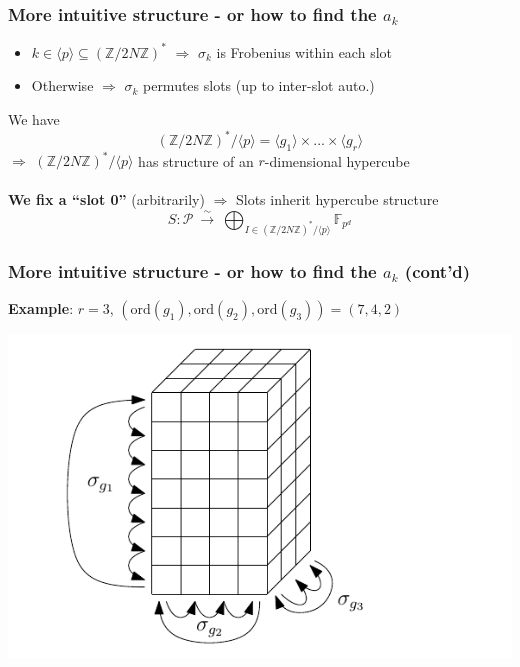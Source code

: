 \documentclass{beamer}
\newcommand{\Z}{\mathbb{Z}}
\newcommand{\F}{\mathbb{F}}
\begin{document}
\begin{frame}
    \frametitle{More intuitive structure - or how to find the $a_k$}
    \begin{itemize}
        \item $k \in \langle p \rangle \subseteq (\Z/2N\Z)^*$ $\Rightarrow$ $\sigma_k$ is Frobenius within each slot
        \item Otherwise $\Rightarrow$ $\sigma_k$ permutes slots (up to inter-slot auto.)
    \end{itemize}
    We have
    \begin{equation*}
        (\Z/2N\Z)^*/\langle p \rangle = \langle g_1 \rangle \times ... \times \langle g_r \rangle
    \end{equation*}
    $\Rightarrow$ $(\Z/2N\Z)^*/\langle p \rangle$ has structure of an $r$-dimensional hypercube
    \\~\\
    \textbf{We fix a ``slot 0''} (arbitrarily) $\Rightarrow$ Slots inherit hypercube structure
    \begin{equation*}
        S: \mathcal{P} \ \overset{\sim}{\longrightarrow} \ \bigoplus_{I \in (\Z/2N\Z)^*/\langle p \rangle} \F_{p^d}
    \end{equation*}
\end{frame}

\begin{frame}
    \frametitle{More intuitive structure - or how to find the $a_k$ (cont'd)}

    \textbf{Example}: $r = 3$, $(\mathrm{ord}(g_1), \mathrm{ord}(g_2), \mathrm{ord}(g_3)) = (7, 4, 2)$
    \begin{center}
        \includegraphics{hypercube.pdf}
    \end{center}
\end{frame}
\end{document}
